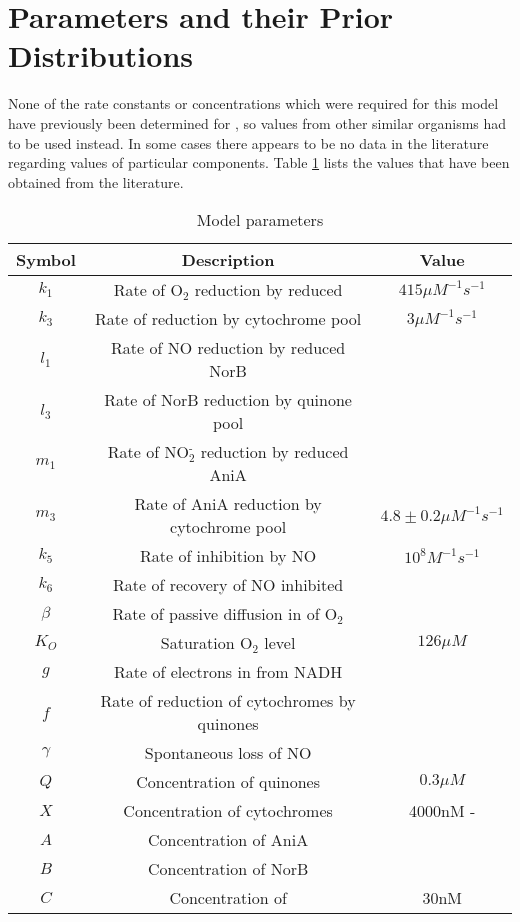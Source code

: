 \section{Parameters and their Prior Distributions}

None of the rate constants or concentrations which were required for this model have previously been determined for \Nsm, so values from other similar organisms had to be used instead. In some cases there appears to be no data in the literature regarding values of particular components. Table \ref{tab:ps} lists the values that have been obtained from the literature.

\begin{table}[ht!]
\begin{center}
\begin{tabular}{ccc}
\toprule
\textbf{Symbol} & \textbf{Description} & \textbf{Value}\\
\midrule
$k_1$ & Rate of O$_{\textrm{2}}$ reduction by reduced \cbbthree{} & $415\mu M^{-1} s^{-1}$ \\
$k_3$ & Rate of \cbbthree{} reduction by cytochrome pool & $3\mu M^{-1} s^{-1}$\\ 
$l_1$ & Rate of NO reduction by reduced NorB\\
$l_3$ & Rate of NorB reduction by quinone pool\\
$m_1$ & Rate of NO$_{\textrm{2}}^{\textrm{-}}$ reduction by reduced AniA\\
$m_3$ & Rate of AniA reduction by cytochrome pool & $4.8\pm0.2 \mu M^{-1}s^{-1}$\\
$k_5$ & Rate of \cbbthree{} inhibition by NO & $10^8 M ^{-1} s ^{-1}$\\
$k_6$ & Rate of recovery of NO inhibited \cbbthree{}\\
$\beta$ & Rate of passive diffusion in of O$_{\textrm{2}}$\\
$K_O$ & Saturation O$_{\textrm{2}}$ level & $126\mu M$\\
$g$ & Rate of electrons in from NADH\\
$f$ & Rate of reduction of cytochromes by quinones\\
$\gamma$ & Spontaneous loss of NO\\
$Q$ & Concentration of quinones & $0.3\mu M$\\
$X$ & Concentration of cytochromes & 4000nM - \cbbthree{}\\   
$A$ & Concentration of AniA\\
$B$ & Concentration of NorB\\
$C$ & Concentration of \cbbthree{} & 30nM \\
\bottomrule
\end{tabular}
\caption{Model parameters
\label{tab:ps}}
\end{center}
\end{table}

